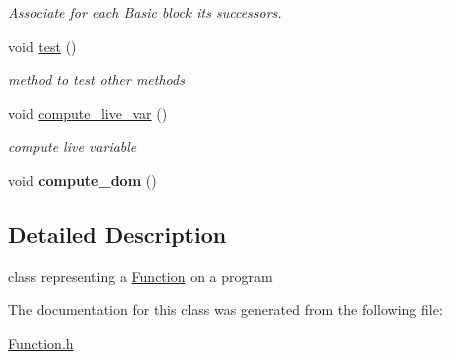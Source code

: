 \begin{DoxyCompactItemize}
\begin{DoxyCompactList}\small\item\em Associate for each Basic block its successors. \end{DoxyCompactList}\item 
\hypertarget{class_function_aaa0d06640a5075c416106a88bd9a833a}{void \hyperlink{class_function_aaa0d06640a5075c416106a88bd9a833a}{test} ()}\label{class_function_aaa0d06640a5075c416106a88bd9a833a}

\begin{DoxyCompactList}\small\item\em method to test other methods \end{DoxyCompactList}\item 
\hypertarget{class_function_a21b614fb69692ba00240831c8fe8beb9}{void \hyperlink{class_function_a21b614fb69692ba00240831c8fe8beb9}{compute\+\_\+live\+\_\+var} ()}\label{class_function_a21b614fb69692ba00240831c8fe8beb9}

\begin{DoxyCompactList}\small\item\em compute live variable \end{DoxyCompactList}\item 
\hypertarget{class_function_a9ecf8e774164937c3dfdb989ebe1c866}{void {\bfseries compute\+\_\+dom} ()}\label{class_function_a9ecf8e774164937c3dfdb989ebe1c866}

\end{DoxyCompactItemize}


\subsection{Detailed Description}
class representing a \hyperlink{class_function}{Function} on a program 

The documentation for this class was generated from the following file\+:\begin{DoxyCompactItemize}
\item 
\hyperlink{_function_8h}{Function.\+h}\end{DoxyCompactItemize}
